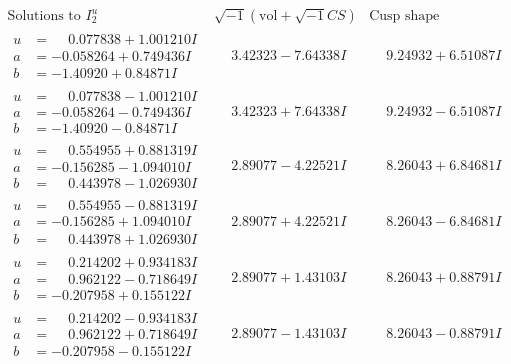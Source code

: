 \documentclass[1p]{elsarticle_modified}
\theoremstyle{definition}
\newcommand{\I}{\sqrt{-1}}
\begin{document}
$$\begin{array}{c|c|c}  
\text{Solutions to }I^u_{2}& \I (\text{vol} + \sqrt{-1}CS) & \text{Cusp shape}\\
 \hline 
\begin{aligned}
u &= \phantom{-}0.077838 + 1.001210 I \\
a &= -0.058264 + 0.749436 I \\
b &= -1.40920 + 0.84871 I\end{aligned}
 & \phantom{-}3.42323 - 7.64338 I & \phantom{-}9.24932 + 6.51087 I \\ \hline\begin{aligned}
u &= \phantom{-}0.077838 - 1.001210 I \\
a &= -0.058264 - 0.749436 I \\
b &= -1.40920 - 0.84871 I\end{aligned}
 & \phantom{-}3.42323 + 7.64338 I & \phantom{-}9.24932 - 6.51087 I \\ \hline\begin{aligned}
u &= \phantom{-}0.554955 + 0.881319 I \\
a &= -0.156285 - 1.094010 I \\
b &= \phantom{-}0.443978 - 1.026930 I\end{aligned}
 & \phantom{-}2.89077 - 4.22521 I & \phantom{-}8.26043 + 6.84681 I \\ \hline\begin{aligned}
u &= \phantom{-}0.554955 - 0.881319 I \\
a &= -0.156285 + 1.094010 I \\
b &= \phantom{-}0.443978 + 1.026930 I\end{aligned}
 & \phantom{-}2.89077 + 4.22521 I & \phantom{-}8.26043 - 6.84681 I \\ \hline\begin{aligned}
u &= \phantom{-}0.214202 + 0.934183 I \\
a &= \phantom{-}0.962122 - 0.718649 I \\
b &= -0.207958 + 0.155122 I\end{aligned}
 & \phantom{-}2.89077 + 1.43103 I & \phantom{-}8.26043 + 0.88791 I \\ \hline\begin{aligned}
u &= \phantom{-}0.214202 - 0.934183 I \\
a &= \phantom{-}0.962122 + 0.718649 I \\
b &= -0.207958 - 0.155122 I\end{aligned}
 & \phantom{-}2.89077 - 1.43103 I & \phantom{-}8.26043 - 0.88791 I \\ \hline\begin{aligned}

\end{aligned}
\end{array}$$
\end{document}
